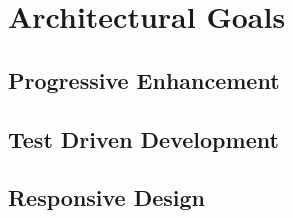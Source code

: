 \section{Architectural Goals}

\subsection{Progressive Enhancement}

\subsection{Test Driven Development}

\subsection{Responsive Design}